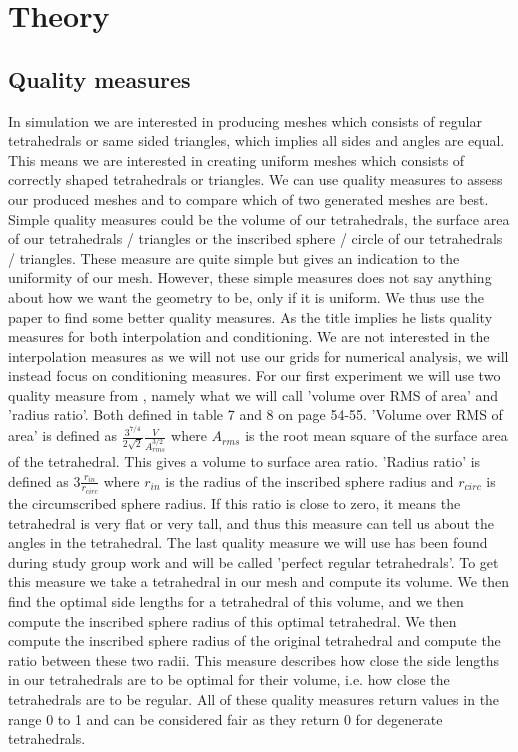 \section{Theory}
\subsection{Quality measures}
In simulation we are interested in producing meshes which consists of regular tetrahedrals or same sided triangles, which implies all sides and angles are equal. This means we are interested in creating uniform meshes which consists of correctly shaped tetrahedrals or triangles. We can use quality measures to assess our produced meshes and to compare which of two generated meshes are best. Simple quality measures could be the volume of our tetrahedrals, the surface area of our tetrahedrals / triangles or the inscribed sphere / circle of our tetrahedrals / triangles. These measure are quite simple but gives an indication to the uniformity of our mesh. However, these simple measures does not say anything about how we want the geometry to be, only if it is uniform. We thus use the paper \cite{Shewchuk} to find some better quality measures. As the title implies he lists quality measures for both interpolation and conditioning. We are not interested in the interpolation measures as we will not use our grids for numerical analysis, we will instead focus on conditioning measures. For our first experiment we will use two quality measure from \cite{Shewchuk}, namely what we will call 'volume over RMS of area' and 'radius ratio'. Both defined in table 7 and 8 on page 54-55. 'Volume over RMS of area' is defined as $\frac{3^{7/4}}{2\sqrt{2}}\frac{V}{A_{rms}^{3/2}}$ where $A_{rms}$ is the root mean square of the surface area of the tetrahedral. This gives a volume to surface area ratio. 'Radius ratio' is defined as $3\frac{r_{in}}{r_{circ}}$ where $r_{in}$ is the radius of the inscribed sphere radius and $r_{circ}$ is the circumscribed sphere radius. If this ratio is close to zero, it means the tetrahedral is very flat or very tall, and thus this measure can tell us about the angles in the tetrahedral. The last quality measure we will use has been found during study group work and will be called 'perfect regular tetrahedrals'. To get this measure we take a tetrahedral in our mesh and compute its volume. We then find the optimal side lengths for a tetrahedral of this volume, and we then compute the inscribed sphere radius of this optimal tetrahedral. We then compute the inscribed sphere radius of the original tetrahedral and compute the ratio between these two radii. This measure describes how close the side lengths in our tetrahedrals are to be optimal for their volume, i.e. how close the tetrahedrals are to be regular. All of these quality measures return values in the range 0 to 1 and can be considered fair as they return 0 for degenerate tetrahedrals.

